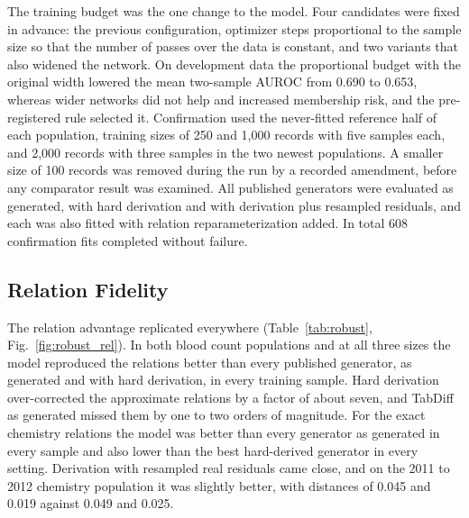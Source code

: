 \documentclass[conference]{IEEEtran}
\begin{document}
The training budget was the one change to the model. Four candidates were fixed in advance: the previous configuration, optimizer steps proportional to the sample size so that the number of passes over the data is constant, and two variants that also widened the network. On development data the proportional budget with the original width lowered the mean two-sample AUROC from 0.690 to 0.653, whereas wider networks did not help and increased membership risk, and the pre-registered rule selected it. Confirmation used the never-fitted reference half of each population, training sizes of 250 and 1,000 records with five samples each, and 2,000 records with three samples in the two newest populations. A smaller size of 100 records was removed during the run by a recorded amendment, before any comparator result was examined. All published generators were evaluated as generated, with hard derivation and with derivation plus resampled residuals, and each was also fitted with relation reparameterization added. In total 608 confirmation fits completed without failure.

\subsection*{Relation Fidelity}

The relation advantage replicated everywhere (Table~\ref{tab:robust}, Fig.~\ref{fig:robust_rel}). In both blood count populations and at all three sizes the model reproduced the relations better than every published generator, as generated and with hard derivation, in every training sample. Hard derivation over-corrected the approximate relations by a factor of about seven, and TabDiff as generated missed them by one to two orders of magnitude. For the exact chemistry relations the model was better than every generator as generated in every sample and also lower than the best hard-derived generator in every setting. Derivation with resampled real residuals came close, and on the 2011 to 2012 chemistry population it was slightly better, with distances of 0.045 and 0.019 against 0.049 and 0.025.
\end{document}
